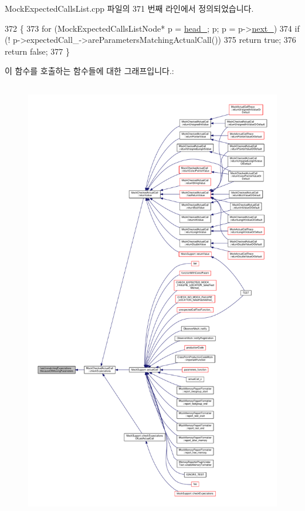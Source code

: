 Mock\+Expected\+Calls\+List.\+cpp 파일의 371 번째 라인에서 정의되었습니다.


\begin{DoxyCode}
372 \{
373     \textcolor{keywordflow}{for} (MockExpectedCallsListNode* p = \hyperlink{class_mock_expected_calls_list_a18290c3c0a206882dd8e0d9f446e2fe6}{head\_}; p; p = p->\hyperlink{class_mock_expected_calls_list_1_1_mock_expected_calls_list_node_aaae452a372ae14c06a6d5d252df73725}{next\_})
374         \textcolor{keywordflow}{if} (! p->expectedCall\_->areParametersMatchingActualCall())
375             \textcolor{keywordflow}{return} \textcolor{keyword}{true};
376     \textcolor{keywordflow}{return} \textcolor{keyword}{false};
377 \}
\end{DoxyCode}


이 함수를 호출하는 함수들에 대한 그래프입니다.\+:
\nopagebreak
\begin{figure}[H]
\begin{center}
\leavevmode
\includegraphics[height=550pt]{class_mock_expected_calls_list_aeed6547f5817eb530c06ddbfb2ea4103_icgraph}
\end{center}
\end{figure}


